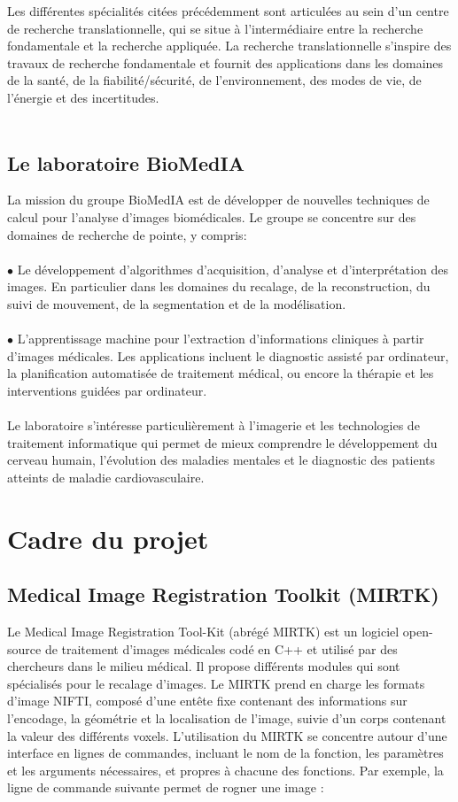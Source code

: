 \documentclass[10pt]{report}
\begin{document}
	Les différentes spécialités citées précédemment sont articulées au sein d'un centre de recherche translationnelle, qui se situe à l'intermédiaire entre la recherche fondamentale et la recherche appliquée. La recherche translationnelle s'inspire des travaux de recherche fondamentale et fournit des applications dans les domaines de la santé, de la fiabilité/sécurité, de l'environnement, des modes de vie, de l'énergie et des incertitudes.
	\\
	\\
	\subsection{Le laboratoire BioMedIA}

	La mission du groupe BioMedIA est de développer de nouvelles techniques de
	calcul pour l'analyse d'images biomédicales. Le groupe se concentre sur des
	domaines de recherche de pointe, y compris:\\
	\\{$\bullet$} Le développement d'algorithmes d'acquisition, d'analyse et d'interprétation des images. En particulier dans les domaines du recalage, de la reconstruction,
	du suivi de mouvement, de la segmentation et de la modélisation. \\
	\\{$\bullet$} L'apprentissage machine pour l'extraction d'informations cliniques à partir
	d'images médicales. Les applications incluent le diagnostic assisté par
	ordinateur, la planification automatisée de traitement médical, ou encore la thérapie et les interventions guidées par ordinateur. \\
	\\Le laboratoire s'intéresse particulièrement à l'imagerie et les technologies de
	traitement informatique qui permet de mieux comprendre le
	développement du cerveau humain, l’évolution des maladies mentales et le
	diagnostic des patients atteints de maladie cardiovasculaire.
	
	\section{Cadre du projet} 
	\subsection{Medical Image Registration Toolkit (MIRTK)}
	Le Medical Image Registration Tool-Kit (abrégé MIRTK) est un logiciel open-source de traitement d'images médicales codé en C++ et utilisé par des chercheurs dans le milieu médical. Il propose différents modules qui sont spécialisés pour le recalage d'images. Le MIRTK prend en charge les formats d'image NIFTI, composé d'une entête fixe contenant des informations sur l'encodage, la géométrie et la localisation de l'image, suivie d'un corps contenant la valeur des différents voxels.   
	L'utilisation du MIRTK se concentre autour d'une interface en lignes de commandes, incluant le nom de la fonction, les paramètres et les arguments nécessaires, et propres à chacune des fonctions. Par exemple, la ligne de commande suivante permet de rogner une image :
	
\end{document}
